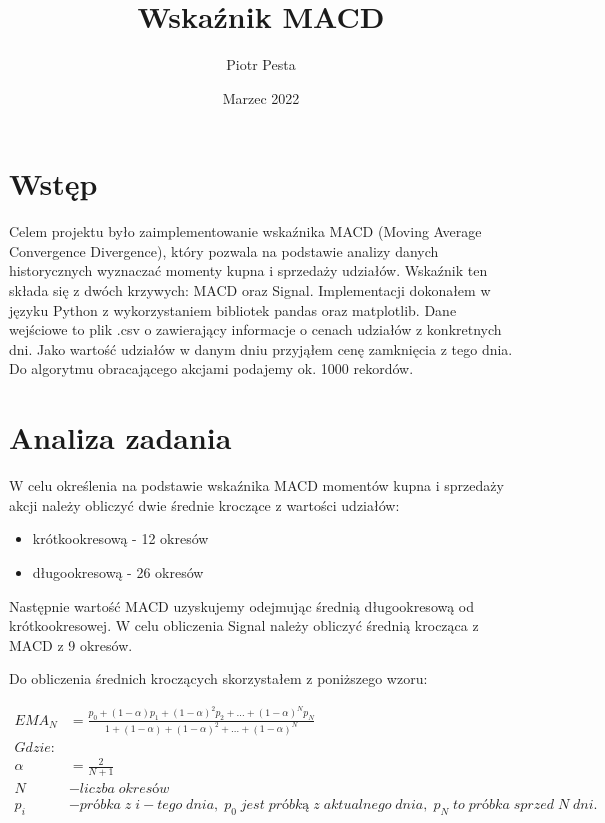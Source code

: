 \documentclass{article}
\title{Wskaźnik MACD}
\author{Piotr Pesta}
\date{Marzec 2022}
\begin{document}
\maketitle

\section{Wstęp}

    Celem projektu było zaimplementowanie wskaźnika MACD (Moving Average Convergence Divergence), który pozwala na podstawie analizy danych historycznych
    wyznaczać momenty kupna i sprzedaży udziałów. Wskaźnik ten składa się z dwóch krzywych: MACD oraz Signal.
    Implementacji dokonałem w języku Python z wykorzystaniem bibliotek pandas oraz matplotlib.
    Dane wejściowe to plik .csv o zawierający informacje o cenach udziałów z konkretnych dni. 
    Jako wartość udziałów w danym dniu przyjąłem cenę zamknięcia z tego dnia. Do algorytmu obracającego akcjami podajemy ok. 1000 rekordów.

\section{Analiza zadania}

    W celu określenia na podstawie wskaźnika MACD momentów kupna i sprzedaży akcji należy obliczyć
    dwie średnie kroczące z wartości udziałów:
    \begin{itemize}
        \item krótkookresową - 12 okresów
        \item długookresową - 26 okresów
    \end{itemize}

    \noindent Następnie wartość MACD uzyskujemy odejmując średnią długookresową od krótkookresowej.
    W celu obliczenia Signal należy obliczyć średnią krocząca z MACD z 9 okresów. 


    Do obliczenia średnich kroczących skorzystałem z poniższego wzoru:
 
        

    \begin{align*} 
        EMA_{N} &= \frac{p_{0} + (1-\alpha)p_{1} + (1-\alpha)^2p_{2} + \ldots + (1-\alpha)^Np_{N}}{1 + (1-\alpha)+(1-\alpha)^2 + \ldots + (1-\alpha)^N} \\
        \mathit{Gdzie:} & \\
        \alpha &= \frac{2}{N + 1} \\
        N &- liczba \; okres \mathit{ó} w \\
        p_{i} &- pr\mathit{ó}bka \; z \; i-tego \;dnia, \;p_{0}\; jest\; pr\mathit{ó}bk\mathit{ą} \;z \;aktualnego \;dnia, \;p_{N} \;to \;pr\mathit{ó}bka \;sprzed \;N \;dni.
    \end{align*}
\end{document}
